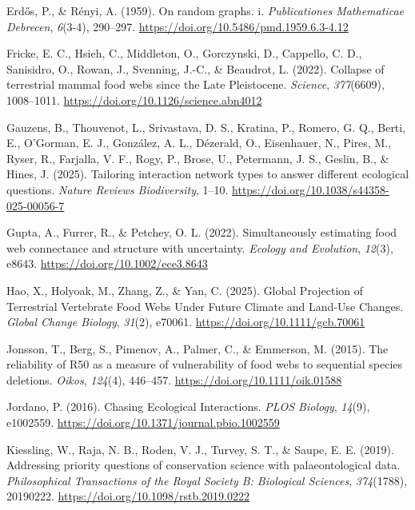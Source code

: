 \documentclass[
]{article}
\newlength{\cslhangindent}
\newenvironment{CSLReferences}[2] %
 {\begin{list}{}{%
  \setlength{\itemindent}{0pt}
  \setlength{\leftmargin}{0pt}
  \setlength{\parsep}{0pt}
  \ifodd #1
   \setlength{\leftmargin}{\cslhangindent}
   \setlength{\itemindent}{-1\cslhangindent}
  \fi
  \setlength{\itemsep}{#2\baselineskip}}}
 {\end{list}}
\begin{document}
\begin{CSLReferences}{1}{0}
Erdős, P., \& Rényi, A. (1959). On random graphs. i. \emph{Publicationes
Mathematicae Debrecen}, \emph{6}(3-4), 290--297.
\url{https://doi.org/10.5486/pmd.1959.6.3-4.12}

Fricke, E. C., Hsieh, C., Middleton, O., Gorczynski, D., Cappello, C.
D., Sanisidro, O., Rowan, J., Svenning, J.-C., \& Beaudrot, L. (2022).
Collapse of terrestrial mammal food webs since the Late Pleistocene.
\emph{Science}, \emph{377}(6609), 1008--1011.
\url{https://doi.org/10.1126/science.abn4012}

Gauzens, B., Thouvenot, L., Srivastava, D. S., Kratina, P., Romero, G.
Q., Berti, E., O'Gorman, E. J., González, A. L., Dézerald, O.,
Eisenhauer, N., Pires, M., Ryser, R., Farjalla, V. F., Rogy, P., Brose,
U., Petermann, J. S., Geslin, B., \& Hines, J. (2025). Tailoring
interaction network types to answer different ecological questions.
\emph{Nature Reviews Biodiversity}, 1--10.
\url{https://doi.org/10.1038/s44358-025-00056-7}

Gupta, A., Furrer, R., \& Petchey, O. L. (2022). Simultaneously
estimating food web connectance and structure with uncertainty.
\emph{Ecology and Evolution}, \emph{12}(3), e8643.
\url{https://doi.org/10.1002/ece3.8643}

Hao, X., Holyoak, M., Zhang, Z., \& Yan, C. (2025). Global Projection of
Terrestrial Vertebrate Food Webs Under Future Climate and Land-Use
Changes. \emph{Global Change Biology}, \emph{31}(2), e70061.
\url{https://doi.org/10.1111/gcb.70061}

Jonsson, T., Berg, S., Pimenov, A., Palmer, C., \& Emmerson, M. (2015).
The reliability of R50 as a measure of vulnerability of food webs to
sequential species deletions. \emph{Oikos}, \emph{124}(4), 446--457.
\url{https://doi.org/10.1111/oik.01588}

Jordano, P. (2016). Chasing Ecological Interactions. \emph{PLOS
Biology}, \emph{14}(9), e1002559.
\url{https://doi.org/10.1371/journal.pbio.1002559}

Kiessling, W., Raja, N. B., Roden, V. J., Turvey, S. T., \& Saupe, E. E.
(2019). Addressing priority questions of conservation science with
palaeontological data. \emph{Philosophical Transactions of the Royal
Society B: Biological Sciences}, \emph{374}(1788), 20190222.
\url{https://doi.org/10.1098/rstb.2019.0222}


\end{CSLReferences}
\end{document}
